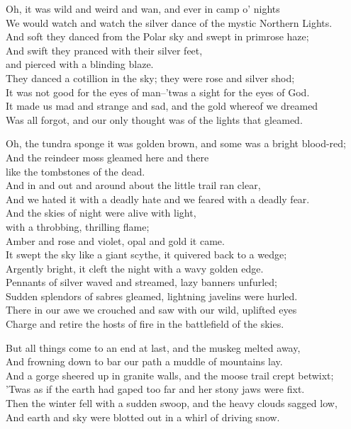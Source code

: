 \begin{poemblock}
Oh, it was wild and weird and wan, and ever in camp o' nights\\
We would watch and watch the silver dance of the mystic Northern Lights.\\
And soft they danced from the Polar sky and swept in primrose haze;\\
And swift they pranced with their silver feet,\\
\idt and pierced with a blinding blaze.\\
They danced a cotillion in the sky; they were rose and silver shod;\\
It was not good for the eyes of man--'twas a sight for the eyes of God.\\
It made us mad and strange and sad, and the gold whereof we dreamed\\
Was all forgot, and our only thought was of the lights that gleamed.

Oh, the tundra sponge it was golden brown, and some was a bright blood-red;\\
And the reindeer moss gleamed here and there\\
\idt like the tombstones of the dead.\\
And in and out and around about the little trail ran clear,\\
And we hated it with a deadly hate and we feared with a deadly fear.\\
And the skies of night were alive with light,\\
\idt with a throbbing, thrilling flame;\\
Amber and rose and violet, opal and gold it came.\\
It swept the sky like a giant scythe, it quivered back to a wedge;\\
Argently bright, it cleft the night with a wavy golden edge.\\
Pennants of silver waved and streamed, lazy banners unfurled;\\
Sudden splendors of sabres gleamed, lightning javelins were hurled.\\
There in our awe we crouched and saw with our wild, uplifted eyes\\
Charge and retire the hosts of fire in the battlefield of the skies.

But all things come to an end at last, and the muskeg melted away,\\
And frowning down to bar our path a muddle of mountains lay.\\
And a gorge sheered up in granite walls, and the moose trail crept betwixt;\\
'Twas as if the earth had gaped too far and her stony jaws were fixt.\\
Then the winter fell with a sudden swoop, and the heavy clouds sagged low,\\
And earth and sky were blotted out in a whirl of driving snow.


\end{poemblock}
